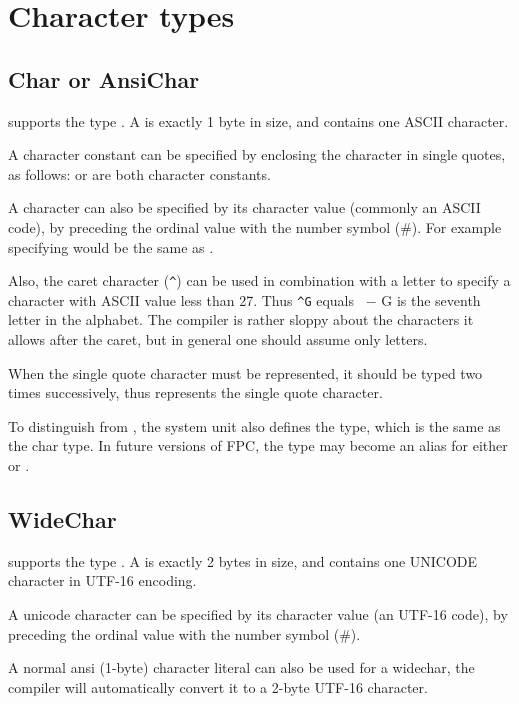 \section{Character types}
\subsection{Char or AnsiChar}
 
\fpc supports the type . A  is exactly 1 byte in
size, and contains one ASCII character.

A character constant can be specified by enclosing the character in single
quotes, as follows:  or  are both character constants.

A character can also be specified by its character
value (commonly an ASCII code), by preceding the ordinal value with the
number symbol (\#). For example specifying  would be the same as .

Also, the caret character (\verb+^+) can be used in combination with a letter to
specify a character with ASCII value less than 27. Thus \verb+^G+ equals
~$-$ G is the seventh letter in the alphabet. The compiler is rather
sloppy about the characters it allows after the caret, but in general one
should assume only letters.

When the single quote character must be represented, it should be typed
two times successively, thus  represents the single quote character.

To distinguish  from , the system unit also defines
the  type, which is the same as the char type. In future
versions of FPC, the  type may become an alias for either 
or .

\subsection{WideChar}
 
\fpc supports the type . A  is exactly 2 bytes in
size, and contains one UNICODE character in UTF-16 encoding.

A unicode character can be specified by its character value
(an UTF-16 code), by preceding the ordinal value with the number symbol (\#).

A normal ansi (1-byte) character literal can also be used for a widechar,
the compiler will automatically convert it to a 2-byte UTF-16 character.

